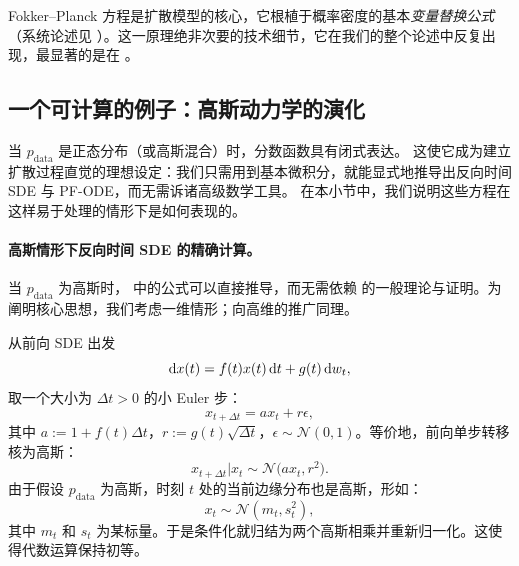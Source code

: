 Fokker–Planck 方程是扩散模型的核心，它根植于概率密度的基本\emph{变量替换公式}（系统论述见 ）。这一原理绝非次要的技术细节，它在我们的整个论述中反复出现，最显著的是在 。



\subsection{一个可计算的例子：高斯动力学的演化}\label{subsec:example-gaussian}
当 $p_{\mathrm{data}}$ 是正态分布（或高斯混合）时，分数函数具有闭式表达。
这使它成为建立扩散过程直觉的理想设定：我们只需用到基本微积分，就能显式地推导出反向时间 SDE 与 PF-ODE，而无需诉诸高级数学工具。
在本小节中，我们说明这些方程在这样易于处理的情形下是如何表现的。



\paragraph{高斯情形下反向时间 SDE 的精确计算。}
 当 $p_{\mathrm{data}}$ 为高斯时， 中的公式可以直接推导，而无需依赖 \citet{anderson1982reverse} 的一般理论与证明。为阐明核心思想，我们考虑一维情形；向高维的推广同理。



从前向 SDE 出发
\[
\mathop{}\!\mathrm{d} x(t)  =  f(t)  x(t)  \mathop{}\!\mathrm{d} t  +  g(t)  \mathop{}\!\mathrm{d} w_t,
\]
取一个大小为 $\Delta t>0$ 的小 Euler 步：
\[
x_{t+\Delta t}  =  a  x_t  +  r  \epsilon,
\]
其中 $a:=1+f(t)\Delta t$，$r:=g(t)\sqrt{\Delta t}$，$ \epsilon\sim\mathcal N(0,1)$。等价地，前向单步转移核为高斯：
\[
x_{t+\Delta t}   |   x_t  \sim  \mathcal N\!\big(a  x_t,   r^2\big).
\]
由于假设 $p_{\mathrm{data}}$ 为高斯，时刻 $t$ 处的当前边缘分布也是高斯，形如：
\[
x_t \sim \mathcal N(m_t,   s_t^2),
\]
其中 $m_t$ 和 $s_t$ 为某标量。于是条件化就归结为两个高斯相乘并重新归一化。这使得代数运算保持初等。

